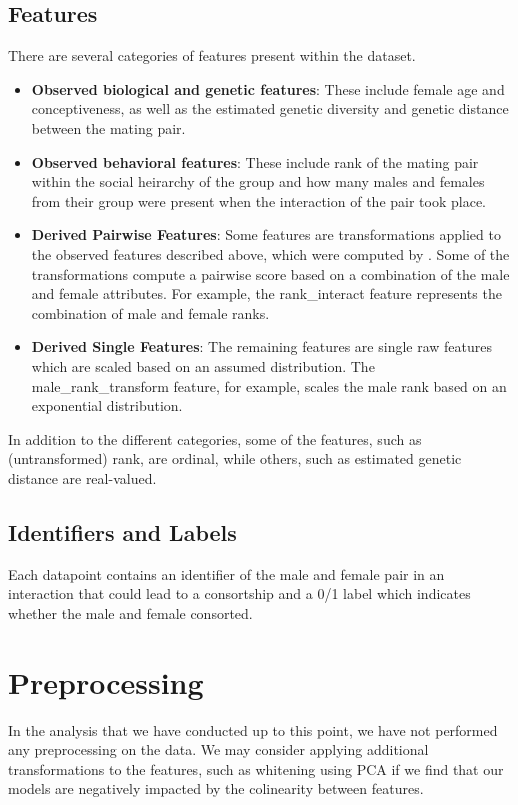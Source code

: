 \documentclass[twoside,twocolumn,paper=letter]{article}
\begin{document}
\subsection{Features}
There are several categories of features present within the dataset.
\begin{itemize}
  \item{\textbf{Observed biological and genetic features}: These include female age
    and conceptiveness, as well as the estimated genetic diversity and genetic
    distance between the mating pair.}
  \item{\textbf{Observed behavioral features}: These include rank of the mating pair
    within the social heirarchy of the group and how many males and females from
    their group were present when the interaction of the pair took place.}
  \item{\textbf{Derived Pairwise Features}: Some features are
    transformations applied to the observed features described above, which were
    computed by \cite{Tung:2012}. Some of the transformations compute a pairwise
    score based on a combination of the male and female attributes. For example,
    the rank\_interact feature represents the combination of male and female
    ranks.
    }
  \item{\textbf{Derived Single Features}: The remaining features are single
    raw features which are scaled based on an assumed distribution.  The
    male\_rank\_transform feature, for example, scales the male rank based on an
    exponential distribution.}
\end{itemize}

In addition to the different categories, some of the features, such as
(untransformed) rank, are ordinal, while others, such as estimated genetic
distance are real-valued.

\subsection{Identifiers and Labels}
Each datapoint contains an identifier of the male and female pair in an
interaction that could lead to a consortship and a 0/1 label which indicates
whether the male and female consorted.

\section{Preprocessing}

In the analysis that we have conducted up to this point, we have not performed
any preprocessing on the data. We may consider applying additional
transformations to the features, such as whitening using PCA if we find that our
models are negatively impacted by the colinearity between features.
\end{document}
